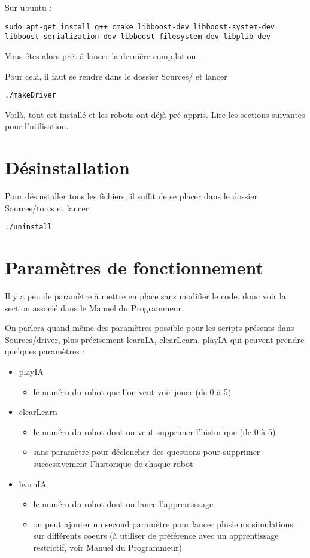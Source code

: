 \documentclass[a4paper,12pt]{article}
\begin{document}
  Sur ubuntu : 
    \begin{lstlisting}
sudo apt-get install g++ cmake libboost-dev libboost-system-dev libboost-serialization-dev libboost-filesystem-dev libplib-dev
    \end{lstlisting}
    
    Vous êtes alors prêt à lancer la dernière compilation.
    
    Pour celà, il faut se rendre dans le dossier Sources/ et lancer
    \begin{lstlisting}
./makeDriver
    \end{lstlisting}
    
    Voilà, tout est installé et les robots ont déjà pré-appris. Lire les sections suivantes pour l'utilisation.
    
  \section{Désinstallation}
  
  Pour désinstaller tous les fichiers, il suffit de se placer dans le dossier Sources/torcs et lancer
    \begin{lstlisting}
./uninstall
    \end{lstlisting}
 
  \section{Paramètres de fonctionnement}

  Il y a peu de paramètre à mettre en place sans modifier le code, donc voir la section associé dans le 
  Manuel du Programmeur.
  
  On parlera quand même des paramètres possible pour les scripts présents dans Sources/driver, plus précisement
  learnIA, clearLearn, playIA qui peuvent prendre quelques paramètres :
  \begin{itemize}
    \item playIA 
    \begin{itemize}
     \item le numéro du robot que l'on veut voir jouer (de 0 à 5)
    \end{itemize}
    \item clearLearn 
      \begin{itemize}
	\item le numéro du robot dont on veut supprimer l'historique (de 0 à 5)
	\item sans paramètre pour déclencher des questions pour supprimer successivement l'historique de chaque robot
      \end{itemize}
      \item learnIA
      \begin{itemize}
	\item le numéro du robot dont on lance l'apprentissage
	\item on peut ajouter un second paramètre pour lancer plusieurs simulations sur différents coeurs
	(à utiliser de préférence avec un apprentissage restrictif, voir Manuel du Programmeur)
      \end{itemize}
  \end{itemize}
\end{document}

